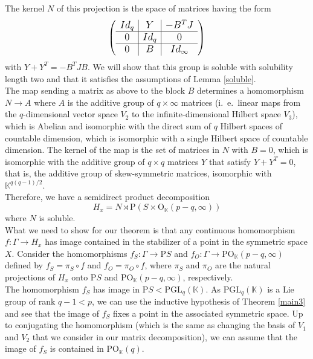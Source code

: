 \documentclass{article}
\theoremstyle{definition}
\theoremstyle{remark}
\theoremstyle{plain}
\begin{document}
The kernel $N$ of this projection is the space of matrices having the form $$\large \left(\begin{array}{c|c|c}
    Id_q & Y & -B^T J \\
    \hline
    0 & Id_q & 0 \\
    \hline
    0 & B & Id_\infty
\end{array}\right)$$ with $Y + Y^T = - B^T J B$. We will show that this group is soluble with solubility length two and that it satisfies the assumptions of Lemma \ref{soluble}. \\

The map sending a matrix as above to the block $B$ determines a homomorphism $N\rightarrow A$ where $A$ is the additive group of $q\times\infty$ matrices (i.~e.~linear maps from the $q$-dimensional vector space $V_2$ to the infinite-dimensional Hilbert space $V_3$), which is Abelian and isomorphic with the direct sum of $q$ Hilbert spaces of countable dimension, which is isomorphic with a single Hilbert space of countable dimension. The kernel of the map is the set of matrices in $N$ with $B=0$, which is isomorphic with the additive group of $q\times q$ matrices $Y$ that satisfy $Y+Y^T=0$, that is, the additive group of skew-symmetric matrices, isomorphic with $\mathbb{K}^{q(q-1)/2}$. \\

Therefore, we have a semidirect product decomposition $$H_x=N\rtimes\mathrm{P}(S\times \mathrm{O}_\mathbb{K}(p-q,\infty))$$ where $N$ is soluble. \\

What we need to show for our theorem is that any continuous homomorphism $f: \Gamma\rightarrow H_x$ has image contained in the stabilizer of a point in the symmetric space $X$. Consider the homomorphisms $f_S: \Gamma\rightarrow\mathrm{P}S$ and $f_O: \Gamma\rightarrow \mathrm{PO}_\mathbb{K}(p-q,\infty)$ defined by $f_S=\pi_S\circ f$ and $f_O=\pi_O\circ f$, where $\pi_S$ and $\pi_O$ are the natural projections of $H_x$ onto $\mathrm{P}S$ and $\mathrm{PO}_\mathbb{K}(p-q,\infty)$, respectively. \\

The homomorphism $f_S$ has image in $\mathrm{P}S<\mathrm{PGL}_q(\mathbb{K})$. As $\mathrm{PGL}_q(\mathbb{K})$ is a Lie group of rank $q-1<p$, we can use the inductive hypothesis of Theorem \ref{main3} and see that the image of $f_S$ fixes a point in the associated symmetric space. Up to conjugating the homomorphism (which is the same as changing the basis of $V_1$ and $V_2$ that we consider in our matrix decomposition), we can assume that the image of $f_S$ is contained in $\mathrm{PO}_\mathbb{K}(q)$. \\
\end{document}
